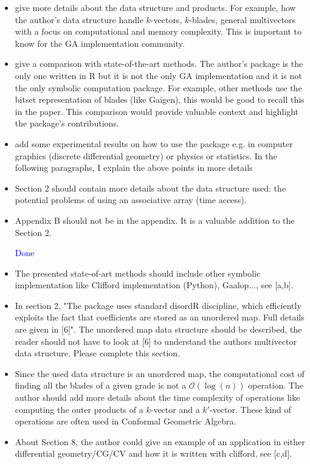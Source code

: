 \documentclass{article}
\begin{document}
\begin{itemize}
\item give more details about the data structure and products.  For
  example, how the author's data structure handle $k$-vectors,
  $k$-blades, general multivectors with a focus on computational and
  memory complexity.  This is important to know for the GA
  implementation community.

\item give a comparison with state-of-the-art methods.  The author's
  package is the only one written in R but it is not the only GA
  implementation and it is not the only symbolic computation
  package.  For example, other methods use the bitset representation of
  blades (like Gaigen), this would be good to recall this in the
  paper.  This comparison would provide valuable context and highlight
  the package's contributions.
  
\item add some experimental results on how to use the package e.g. in
  computer graphics (discrete differential geometry) or physics or
  statistics.  In the following paragraphs, I explain the above points
  in more details

\item Section 2 should contain more details about the data structure
  used: the potential problems of using an associative array (time
  access).

\item Appendix B should not be in the appendix.  It is a valuable
  addition to the Section 2.

  \textcolor{blue}{Done}
  
\item The presented state-of-art methods should include other symbolic
  implementation like Clifford implementation (Python), Gaalop..., see
  [a,b].

\item In section 2, "The package uses standard disordR discipline,
  which efficiently exploits the fact that coefficients are stored as
  an unordered map.  Full details are given in [6]".  The unordered
  map data structure should be described, the reader should not have
  to look at [6] to understand the authors multivector data
  structure. Please complete this section.

\item Since the used data structure is an unordered map, the
  computational cost of finding all the blades of a given grade is not
  a $\mathcal{O}(\log(n))$ operation.  The author should add more
  details about the time complexity of operations like computing the
  outer products of a $k$-vector and a $k'$-vector.  These kind of
  operations are often used in Conformal Geometric Algebra.

\item About Section 8, the author could give an example of an
  application in either differential geometry/CG/CV and how it is
  written with clifford, see [c,d].

\end{itemize}
\end{document}
